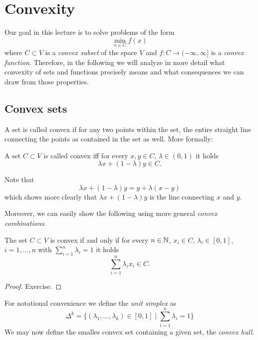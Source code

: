 \chapter{Convexity}

Our goal in this lecture is to solve problems of the form 
\begin{equation}
    \min_{x\in C} f(x)
\end{equation}
where $C\subset V$ is a \emph{convex subset} of the space $V$ and $f:C\rightarrow (-\infty,\infty]$ is a \emph{convex function}. Therefore, in the following we will analyze in more detail what convexity of sets and functions precisely means and what consequences we can draw from those properties.

\section{Convex sets}
A set is called convex if for any two points within the set, the entire straight line connecting the points as contained in the set as well. More formally:
\begin{defn}
    A set $C\subset V$ is called convex iff for every $x,y\in C$, $\lambda\in (0,1)$ it holds
    \begin{equation}
        \lambda x + (1-\lambda) y\in C.
    \end{equation}
\end{defn}

Note that
\begin{equation}
    \lambda x + (1-\lambda) y = y + \lambda(x-y)
\end{equation}
which shows more clearly that $\lambda x + (1-\lambda) y$ is the line connecting $x$ and $y$.

Moreover, we can easily show the following using more general \emph{convex combinations}.

\begin{lemma}
    The set $C\subset V$ is convex if and only if for every $n\in \mathbb{N}$, $x_i\in C$, $\lambda_i\in [0,1]$, $i=1,\dots,n$ with $\sum_{i=1}^n\lambda_i=1$ it holds
    \begin{equation}
        \sum_{i=1}^n\lambda_i x_i \in C.
    \end{equation}
\end{lemma}
\begin{proof}
    Exercise.
\end{proof}

For notational convenience we define the \emph{unit simplex} as 
\begin{equation}
    \Delta^k = \{(\lambda_1,\dots,\lambda_k)\in [0,1]\;|\;\sum_{i=1}^n\lambda_i = 1\}
\end{equation}
We may now define the smalles convex set containing a given set, the \emph{convex hull}.

